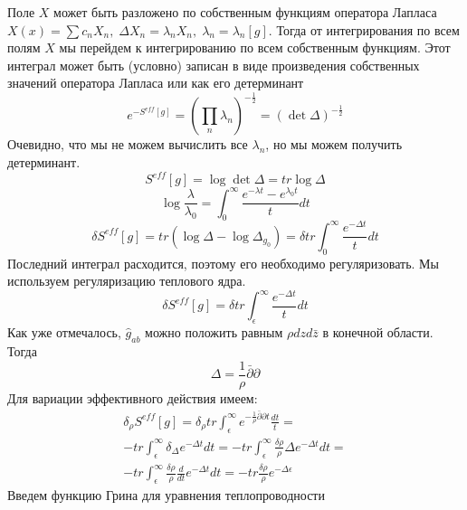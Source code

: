 \documentclass[a4paper,12pt]{article}
\theoremstyle{definition} \newtheorem{Def}{Definition}
\begin{document}
Поле $X$ может быть разложено по собственным функциям оператора Лапласа $X(x)=\sum c_n X_n,\; \Delta X_n = \lambda_n X_n,\; \lambda_n=\lambda_n[g]$.
Тогда от интегрирования по всем полям $X$ мы перейдем к интегрированию по всем собственным функциям. Этот интеграл может быть (условно) записан в виде произведения собственных значений оператора Лапласа или как его детерминант
\begin{equation}
  \label{eq:36}
  e^{-S^{eff}[g]}=\left(\prod_{n} \lambda_n\right)^{-\frac{1}{2}}=(\det \Delta)^{-\frac{1}{2}}
\end{equation}
Очевидно, что мы не можем вычислить все  $\lambda_n$, но мы можем получить детерминант.
\begin{equation}
  \label{eq:37}
  S^{eff}[g]=\log \det \Delta=tr \log \Delta
\end{equation}
\begin{equation}
  \label{eq:38}
  \log\frac{\lambda}{\lambda_0}=\int_0^{\infty}\frac{e^{-\lambda t}-e^{\lambda_0 t}}{t}dt
\end{equation}
\begin{equation}
  \label{eq:39}
  \delta S^{eff}[g]=tr (\log\Delta -\log\Delta_{g_0})=\delta tr \int_0^{\infty}\frac{e^{-\Delta t}}{t} dt
\end{equation}
Последний интеграл расходится, поэтому его необходимо регуляризовать. Мы используем регуляризацию теплового ядра.
\begin{equation}
  \label{eq:40}
  \delta S^{eff}[g]=\delta tr \int_{\epsilon}^{\infty}\frac{e^{-\Delta t}}{t} dt
\end{equation}
Как уже отмечалось, $\hat{g}_{ab}$ можно положить равным $\rho dz d\bar{z}$ в конечной области. Тогда
\begin{equation}
  \label{eq:41}
  \Delta=\frac{1}{\rho}\bar{\partial}\partial
\end{equation}
Для вариации эффективного действия имеем:
  \begin{multline}
  \label{eq:42}
    \delta_{\rho}S^{eff}[g]=\delta_{\rho} tr \int_{\epsilon}^{\infty} e^{-\frac{1}{\rho}\bar{\partial}\partial t}\frac{dt}{t}=\\
    - tr \int_{\epsilon}^{\infty}\delta_{\Delta}e^{-\Delta t} dt=
    -tr \int_{\epsilon}^{\infty}\frac{\delta\rho}{\rho}\Delta e^{-\Delta t} dt=\\
    -tr \int_{\epsilon}^{\infty}\frac{\delta\rho}{\rho}\frac{d}{dt} e^{-\Delta t} dt=-tr \frac{\delta\rho}{\rho}e^{-\Delta \epsilon}
  \end{multline}
Введем функцию Грина для уравнения теплопроводности
\end{document}
